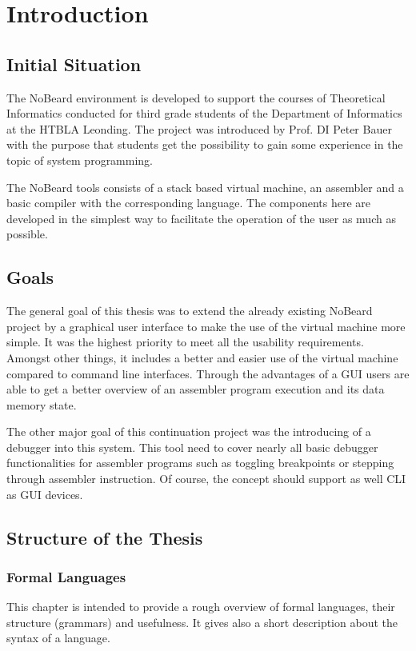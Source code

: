 \chapter{Introduction}
\section{Initial Situation}
The NoBeard environment is developed to support the courses of Theoretical Informatics conducted for third grade students of the Department of Informatics at the HTBLA Leonding. The project was introduced by Prof. DI Peter Bauer with the purpose that students get the possibility to gain some experience in the topic of system programming. 

The NoBeard tools consists of a stack based virtual machine, an assembler and a basic compiler with the corresponding language. The components here are developed in the simplest way  to facilitate the operation of the user as much as possible.

\section{Goals}
The general goal of this thesis was to extend the already existing NoBeard project by a graphical user interface to make the use of the virtual machine more simple. It was the highest priority to meet all the usability requirements. Amongst other things, it includes a better and easier use of the virtual machine compared to command line interfaces. Through the advantages of a GUI users are able to get a better overview of an assembler program execution and its data memory state.

The other major goal of this continuation project was the introducing of a debugger into this system. This tool need to cover nearly all basic debugger functionalities for assembler programs such as toggling breakpoints or stepping through assembler instruction. Of course, the concept should support as well CLI as GUI devices.

\section{Structure of the Thesis}
\subsection{Formal Languages}
This chapter is intended to provide a rough overview of formal languages, their structure (grammars) and usefulness. It gives also a short description about the syntax of a language.
